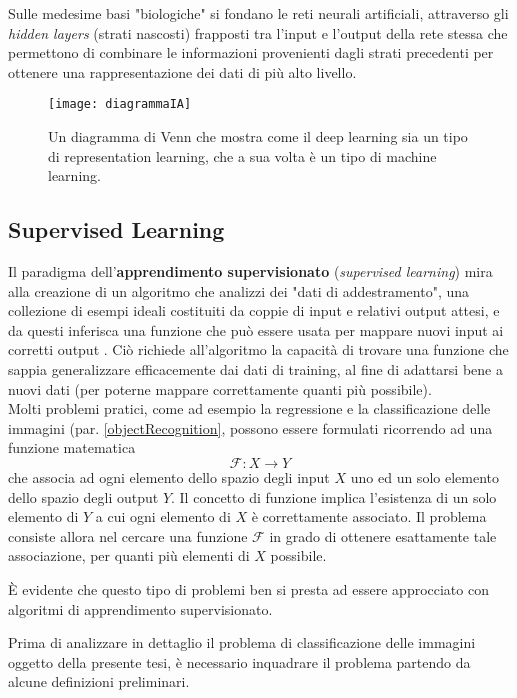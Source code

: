 Sulle medesime basi "biologiche" si fondano le reti neurali artificiali, attraverso gli \textit{hidden layers} (strati nascosti) frapposti tra l'input e l'output della rete stessa che permettono di combinare le informazioni provenienti dagli strati precedenti per ottenere una rappresentazione dei dati di più alto livello.

\begin{figure}[h]
\centering
\texttt{[image: diagrammaIA]}
\caption{Un diagramma di Venn che mostra come il deep learning sia un tipo di
representation learning, che a sua volta è un tipo di machine learning.}
\label{diagrammaAI}
\end{figure}


\subsection{Supervised Learning}
\label{supervisedLearning}

Il paradigma dell'\textbf{apprendimento supervisionato} (\textit{supervised learning}) mira alla creazione di un algoritmo che analizzi dei "dati di addestramento", una collezione di esempi ideali costituiti da coppie di input e relativi output attesi, e da questi inferisca una funzione che può essere usata per mappare nuovi input ai corretti output \cite{Russell2009}.
Ciò richiede all'algoritmo la capacità di trovare una funzione che sappia generalizzare efficacemente dai dati di training, al fine di adattarsi bene a nuovi dati (per poterne mappare correttamente quanti più possibile).\\

Molti problemi pratici, come ad esempio la regressione e la classificazione delle immagini (par. \ref{objectRecognition}, possono essere formulati ricorrendo ad una funzione matematica
\[\mathcal{F}:X\to Y\]
che associa ad ogni elemento dello spazio degli input $X$ uno ed un solo elemento dello spazio degli output $Y$.
Il concetto di funzione implica l'esistenza di un solo elemento di $Y$ a cui ogni elemento di $X$ è correttamente associato. Il problema consiste allora nel cercare una funzione $\mathcal{F}$ in grado di ottenere esattamente tale associazione, per quanti più elementi di $X$ possibile.

È evidente che questo tipo di problemi ben si presta ad essere approcciato con algoritmi di apprendimento supervisionato.

Prima di analizzare in dettaglio il problema di classificazione delle immagini oggetto della presente tesi, è necessario inquadrare il problema partendo da alcune definizioni preliminari.\\

